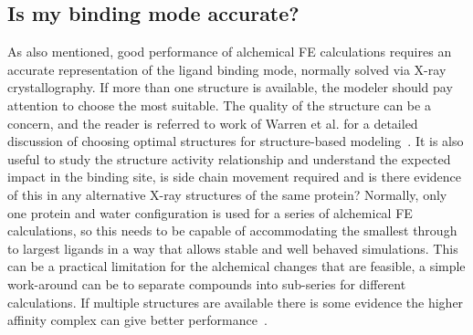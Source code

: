\documentclass[9pt,bestpractices]{livecoms}
\begin{document}
\subsection{Is my binding mode accurate?}
As also mentioned, good performance of alchemical FE calculations requires an accurate representation of the ligand binding mode, normally solved via X-ray crystallography. If more than one structure is available, the modeler should pay attention to choose the most suitable. The quality of the structure can be a concern, and the reader is referred to work of Warren et al. for a detailed discussion of choosing optimal structures for structure-based modeling~\cite{warren2012essential}. It is also useful to study the structure activity relationship and understand the expected impact in the binding site, is side chain movement required and is there evidence of this in any alternative X-ray structures of the same protein? Normally, only one protein and water configuration is used for a series of alchemical FE calculations, so this needs to be capable of accommodating the smallest through to largest ligands in a way that allows stable and well behaved simulations. This can be a practical limitation for the alchemical changes that are feasible, a simple work-around can be to separate compounds into sub-series for different calculations. If multiple structures are available there is some evidence the higher affinity complex can give better performance~\cite{perez-benito2019predicting}.
%
\end{document}
